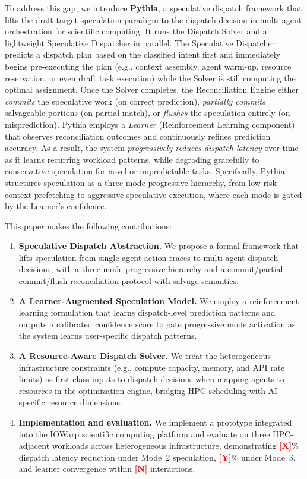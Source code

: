 \documentclass[conference,10pt]{IEEEtran}
\newcommand{\placeholder}[1]{\textcolor{red}{\textbf{[#1]}}}
\begin{document}
To address this gap, we introduce \textbf{Pythia}, a speculative dispatch framework that lifts the draft-target speculation paradigm to the dispatch decision in multi-agent orchestration for scientific computing.
It runs the Dispatch Solver and a lightweight Speculative Dispatcher in parallel. The Speculative Dispatcher predicts a dispatch plan based on the classified intent first and immediately begins pre-executing the plan (e.g., context assembly, agent warm-up, resource reservation, or even draft task execution) while the Solver is still computing the optimal assignment.
Once the Solver completes, the Reconciliation Engine either \emph{commits} the speculative work (on correct prediction), \emph{partially commits} salvageable portions (on partial match), or \emph{flushes} the speculation entirely (on misprediction).
Pythia employs a \emph{Learner} (Reinforcement Learning component) that observes reconciliation outcomes and continuously refines prediction accuracy. As a result, the system \emph{progressively reduces dispatch latency} over time as it learns recurring workload patterns, while degrading gracefully to conservative speculation for novel or unpredictable tasks.
Specifically, Pythia structures speculation as a three-mode progressive hierarchy, from low-risk context prefetching to aggressive speculative execution, where each mode is gated by the Learner's confidence.

This paper makes the following contributions:
\begin{enumerate}
    \item \textbf{Speculative Dispatch Abstraction.} We propose a formal framework that lifts speculation from single-agent action traces to multi-agent dispatch decisions, with a three-mode progressive hierarchy and a commit/partial-commit/flush reconciliation protocol with salvage semantics.
    \item \textbf{A Learner-Augmented Speculation Model.} We employ a reinforcement learning formulation that learns dispatch-level prediction patterns and outputs a calibrated confidence score to gate progressive mode activation as the system learns user-specific dispatch patterns.
    \item \textbf{A Resource-Aware Dispatch Solver.} We treat the heterogeneous infrastructure constraints (e.g., compute capacity, memory, and API rate limits) as first-class inputs to dispatch decisions when mapping agents to resources in the optimization engine, bridging HPC scheduling with AI-specific resource dimensions.
    \item \textbf{Implementation and evaluation.} We implement a prototype integrated into the IOWarp scientific computing platform and evaluate on three HPC-adjacent workloads across heterogeneous infrastructure, demonstrating \placeholder{X}\% dispatch latency reduction under Mode~2 speculation, \placeholder{Y}\% under Mode~3, and learner convergence within \placeholder{N} interactions.
\end{enumerate}
\end{document}
